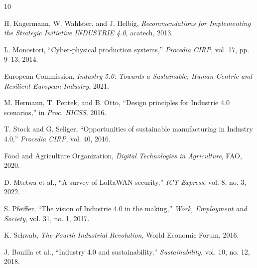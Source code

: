 \documentclass[conference]{IEEEtran}
\begin{document}
\begin{thebibliography}{10}

H. Kagermann, W. Wahlster, and J. Helbig, \emph{Recommendations for Implementing the Strategic Initiative INDUSTRIE 4.0}, acatech, 2013.

L. Monostori, ``Cyber-physical production systems,'' \emph{Procedia CIRP}, vol. 17, pp. 9--13, 2014.

European Commission, \emph{Industry 5.0: Towards a Sustainable, Human-Centric and Resilient European Industry}, 2021.

M. Hermann, T. Pentek, and B. Otto, ``Design principles for Industrie 4.0 scenarios,'' in \emph{Proc. HICSS}, 2016.

T. Stock and G. Seliger, ``Opportunities of sustainable manufacturing in Industry 4.0,'' \emph{Procedia CIRP}, vol. 40, 2016.

Food and Agriculture Organization, \emph{Digital Technologies in Agriculture}, FAO, 2020.

D. Mtetwa et al., ``A survey of LoRaWAN security,'' \emph{ICT Express}, vol. 8, no. 3, 2022.

S. Pfeiffer, ``The vision of Industrie 4.0 in the making,'' \emph{Work, Employment and Society}, vol. 31, no. 1, 2017.

K. Schwab, \emph{The Fourth Industrial Revolution}, World Economic Forum, 2016.

J. Bonilla et al., ``Industry 4.0 and sustainability,'' \emph{Sustainability}, vol. 10, no. 12, 2018.

\end{thebibliography}
\end{document}
